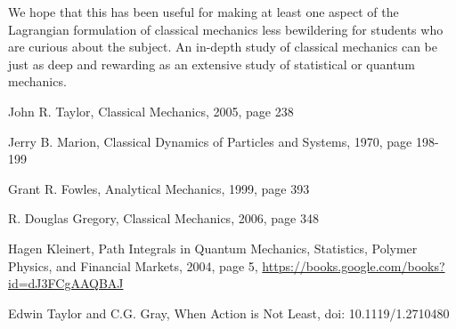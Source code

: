 \documentclass[prb,preprint]{revtex4-1}
\begin{document}
We hope that this has been useful for making at least one aspect of the Lagrangian formulation of classical mechanics less bewildering for students who are curious about the subject. An in-depth study of classical mechanics can be just as deep and rewarding as an extensive study of statistical or quantum mechanics.  


\begin{thebibliography}{9}

 John R. Taylor, Classical Mechanics, 2005, page 238

 Jerry B. Marion, Classical Dynamics of Particles and Systems, 1970, page 198-199 

 Grant R. Fowles, Analytical Mechanics, 1999, page 393 

 R. Douglas Gregory, Classical Mechanics, 2006, page 348


 Hagen Kleinert, Path Integrals in Quantum Mechanics, Statistics, Polymer Physics, and Financial Markets, 2004, page 5, \url{https://books.google.com/books?id=dJ3FCgAAQBAJ}

 Edwin Taylor and C.G. Gray, When Action is Not Least, doi: 10.1119/1.2710480


\end{thebibliography}
\end{document}
